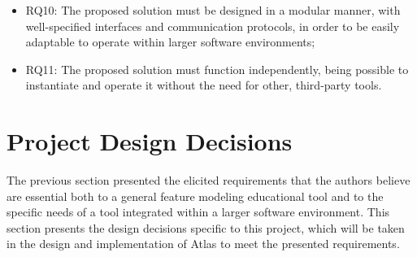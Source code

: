 \begin{itemize}
    \item RQ10: The proposed solution must be designed in a modular manner, with well-specified interfaces and communication protocols, in order to be easily adaptable to operate within larger software environments;
    \item RQ11: The proposed solution must function independently, being possible to instantiate and operate it without the need for other, third-party tools.
\end{itemize}


\section{Project Design Decisions}

The previous section presented the elicited requirements that the authors believe are essential both to a general feature modeling educational tool and to the specific needs of a tool integrated within a larger software environment. This section presents the design decisions specific to this project, which will be taken in the design and implementation of Atlas to meet the presented requirements.